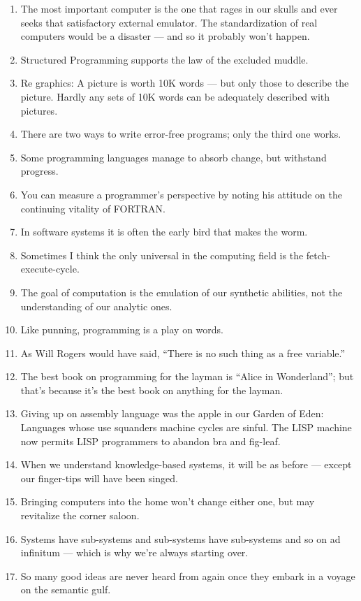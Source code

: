 \documentclass[letterpaper,11pt]{article}
\begin{document}
\begin{multicols}{2}
\begin{enumerate}[wide=0pt,label=\textbf{\arabic*.}]
\item The most important computer is the one that rages in our skulls and ever seeks that satisfactory external emulator. The standardization of real computers would be a disaster --- and so it probably won't happen.
\item Structured Programming supports the law of the excluded muddle.
\item Re graphics: A picture is worth 10K words --- but only those to describe the picture. Hardly any sets of 10K words can be adequately described with pictures.
\item There are two ways to write error-free programs; only the third one works.
\item Some programming languages manage to absorb change, but withstand progress.
\item You can measure a programmer's perspective by noting his attitude on the continuing vitality of FORTRAN.
\item In software systems it is often the early bird that makes the worm.
\item Sometimes I think the only universal in the computing field is the fetch-execute-cycle.
\item The goal of computation is the emulation of our synthetic abilities, not the understanding of our analytic ones.
\item Like punning, programming is a play on words.
\item As Will Rogers would have said, ``There is no such thing as a free variable.''
\item The best book on programming for the layman is ``Alice in Wonderland''; but that's because it's the best book on anything for the layman.
\item Giving up on assembly language was the apple in our Garden of Eden: Languages whose use squanders machine cycles are sinful. The LISP machine now permits LISP programmers to abandon bra and fig-leaf.
\item When we understand knowledge-based systems, it will be as before --- except our finger-tips will have been singed.
\item Bringing computers into the home won't change either one, but may revitalize the corner saloon.
\item Systems have sub-systems and sub-systems have sub-systems and so on ad infinitum --- which is why we're always starting over.
\item So many good ideas are never heard from again once they embark in a voyage on the semantic gulf.

\end{enumerate}
\end{multicols}
\end{document}
